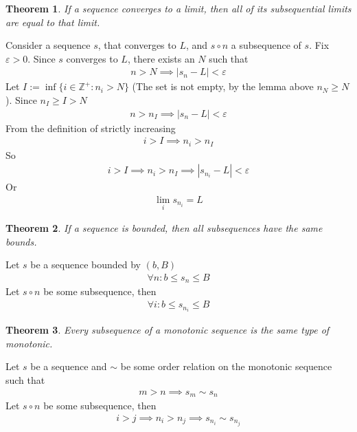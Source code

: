 \documentclass{amsart}
\numberwithin{equation}{section}
\let\oldendproof\endproof
\renewenvironment{proof}[1][\proofname]{%
  \setcounter{case}{0}
  \setcounter{step}{0}
  \oldproof[#1]%
}{\oldendproof}
\theoremstyle{plain}
\newtheorem{theorem}{Theorem}[section]
\theoremstyle{definition}
\theoremstyle{remark}
\begin{document}
\begin{theorem}
  If a sequence converges to a limit, then all of its subsequential limits are equal to that limit.
\end{theorem}
\begin{proof}
  Consider a sequence $s$, that converges to $L$, and $s\circ n$ a subsequence of $s$.
  Fix $\varepsilon>0$. Since $s$ converges to $L$, there exists an $N$ such that
  \begin{align}
    n > N \implies |s_n - L | < \varepsilon
  \end{align}
  Let $I:=\inf\{i\in \mathbb{Z}^+: n_i >N \}$ (The set is not empty, by the lemma above $n_N\geq N$).
  Since $n_I\geq I>N$
  \begin{align}
    n > n_I \implies |s_n - L | < \varepsilon
  \end{align}
  From the definition of strictly increasing
  \begin{align}
    i> I \implies n_i > n_I
  \end{align}
  So
  \begin{align}
    i > I \implies n_i> n_I \implies |s_{n_i} - L | < \varepsilon
  \end{align}
  Or
  \begin{align}
    \lim_i s_{n_i} = L
  \end{align}
\end{proof}

\begin{theorem}
  If a sequence is bounded, then all subsequences have the same bounds.
\end{theorem}
\begin{proof}
  Let $s$ be a sequence bounded by $(b, B)$
  \begin{align}
    \forall n: b\leq s_n \leq B
  \end{align}
  Let $s\circ n$ be some subsequence, then
  \begin{align}
    \forall i: b\leq s_{n_i} \leq B
  \end{align}
\end{proof}

\begin{theorem}
  Every subsequence of a monotonic sequence is the same type of monotonic.
\end{theorem}
\begin{proof}
  Let $s$ be a sequence and $\sim$ be some order relation on the monotonic sequence such that
  \begin{align}
    m> n \implies s_m \sim s_n
  \end{align}
  Let $s\circ n$ be some subsequence, then
  \begin{align}
    i> j \implies n_i > n_j \implies s_{n_i} \sim s_{n_j}
  \end{align}
\end{proof}
\end{document}
